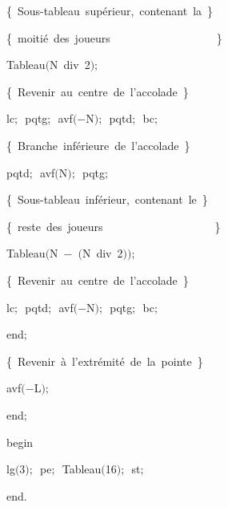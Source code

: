 {\vspace{\neglskip}\mbox{\blc  \blk\blk\blk\blk\blk\idt  \cmt  \{\ Sous-tableau\ supérieur,\ contenant\ la\ \}\idt }\par 
\vspace{\neglskip}\mbox{\blc  \blk\blk\blk\blk\blk\idt  \cmt  \{\ moitié\ des\ joueurs\ \ \ \ \ \ \ \ \ \ \ \ \ \ \ \ \ \ \ \}\idt }\par 
\vspace{\neglskip}\mbox{\blc  \blk\blk\blk\blk\blk\idt  Tableau$($N\ \mcl div\idt \ 2$)$$;$\ }\par 
\vspace{\neglskip}\mbox{\blc  \blk\blk\blk\blk\blk\idt  \cmt  \{\ Revenir\ au\ centre\ de\ l{'}accolade\ \}\idt }\par 
\vspace{\neglskip}\mbox{\blc  \blk\blk\blk\blk\blk\idt  lc$;$\ pqtg$;$\ avf$($$-$N$)$$;$\ pqtd$;$\ bc$;$\ }\par 
\vspace{\neglskip}\mbox{\blc  \blk\blk\blk\blk\blk\idt  \cmt  \{\ Branche\ inférieure\ de\ l{'}accolade\ \}\idt }\par 
\vspace{\neglskip}\mbox{\blc  \blk\blk\blk\blk\blk\idt  pqtd$;$\ avf$($N$)$$;$\ pqtg$;$}\par 
\vspace{\neglskip}\mbox{\blc  \blk\blk\blk\blk\blk\idt  \cmt  \{\ Sous-tableau\ inférieur,\ contenant\ le\ \}\idt }\par 
\vspace{\neglskip}\mbox{\blc  \blk\blk\blk\blk\blk\idt  \cmt  \{\ reste\ des\ joueurs\ \ \ \ \ \ \ \ \ \ \ \ \ \ \ \ \ \ \ \ \}\idt }\par 
\vspace{\neglskip}\mbox{\blc  \blk\blk\blk\blk\blk\idt  Tableau$($N\ $-$\ $($N\ \mcl div\idt \ 2$)$$)$$;$\ }\par 
\vspace{\neglskip}\mbox{\blc  \blk\blk\blk\blk\blk\idt  \cmt  \{\ Revenir\ au\ centre\ de\ l{'}accolade\ \}\idt }\par 
\vspace{\neglskip}\mbox{\blc  \blk\blk\blk\blk\blk\idt  lc$;$\ pqtd$;$\ avf$($$-$N$)$$;$\ pqtg$;$\ bc$;$\ }\par 
\vspace{\neglskip}\mbox{\blc  \blk\blk\blk\idt  \mcl end\idt $;$}\par 
\vspace{\neglskip}\mbox{\blc  \blk\blk\idt  \cmt  \{\ Revenir\ à\ l{'}extrémité\ de\ la\ pointe\ \}\idt }\par 
\vspace{\neglskip}\mbox{\blc  \blk\blk\idt  avf$($$-$L$)$$;$\ }\par 
\vspace{\neglskip}\mbox{\blc  \blk\idt  \mcl end\idt $;$}\par 
\medskip

\vspace{\neglskip}\mbox{\blc  \idt  \mcl begin\idt }\par 
\vspace{\neglskip}\mbox{\blc  \blk\idt  lg$($3$)$$;$\ pe$;$\ Tableau$($16$)$$;$\ st$;$}\par 
\vspace{\neglskip}\mbox{\blc  \idt  \mcl end\idt $.$}\par 

\medskip }

